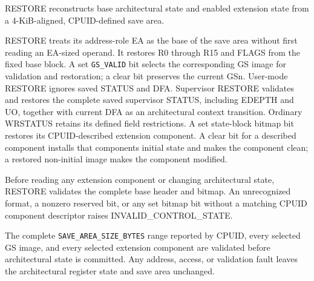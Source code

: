 RESTORE reconstructs base architectural state and enabled extension state from a 4-KiB-aligned, CPUID-defined save area.

RESTORE treats its address-role EA as the base of the save area without first reading an EA-sized operand. It restores R0 through R15 and FLAGS from the fixed base block. A set \texttt{GS\_VALID} bit selects the corresponding GS image for validation and restoration; a clear bit preserves the current GSn. User-mode RESTORE ignores saved STATUS and DFA. Supervisor RESTORE validates and restores the complete saved supervisor STATUS, including EDEPTH and UO, together with current DFA as an architectural context transition. Ordinary WRSTATUS retains its defined field restrictions. A set state-block bitmap bit restores its CPUID-described extension component. A clear bit for a described component installs that component\textquotesingle{}s initial state and makes the component clean; a restored non-initial image makes the component modified.

Before reading any extension component or changing architectural state, RESTORE validates the complete base header and bitmap. An unrecognized format, a nonzero reserved bit, or any set bitmap bit without a matching CPUID component descriptor raises INVALID\_CONTROL\_STATE.

The complete \texttt{SAVE\_AREA\_SIZE\_BYTES} range reported by CPUID, every selected GS image, and every selected extension component are validated before architectural state is committed. Any address, access, or validation fault leaves the architectural register state and save area unchanged.
